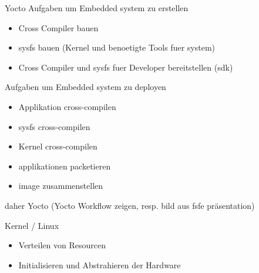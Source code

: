 \begin{frame}{Yocto}
	Aufgaben um Embedded system zu erstellen
	\begin{itemize}
		\item Cross Compiler bauen
		\item sysfs bauen (Kernel und benoetigte Tools fuer system)
		\item Cross Compiler und sysfs fuer Developer bereitstellen (sdk)
	\end{itemize}
	Aufgaben um Embedded system zu deployen
	\begin{itemize}
		\item Applikation cross-compilen
		\item sysfs cross-compilen
		\item Kernel cross-compilen
		\item applikationen packetieren
		\item image zusammenstellen
	\end{itemize}
	daher Yocto (Yocto Workflow zeigen, resp. bild aus fsfe präsentation)
\end{frame}

\begin{frame}{Kernel / Linux}
	\begin{itemize}
		\item Verteilen von Resourcen
		\item Initialisieren und Abstrahieren der Hardware
	\end{itemize}
\end{frame}

